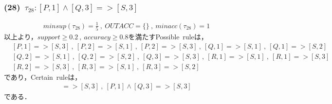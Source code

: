 \documentclass[a4paper,12pt]{jarticle}
\begin{document}
\subsubsection*{(28)~$\tau_{28}:[P,1]\land[Q,3]=>[S,3]$}
\vspace{-4mm}
%
\begin{align*}
 minsup(\tau_{28})=\frac{1}{5}~,~OUTACC=\{\}~,~minacc(\tau_{28})=1
\end{align*}
%
以上より，$support\geq0.2~,~accuracy\geq0.8$を満たすPossible~ruleは，
%
\begin{align*}
 &[P,1]=>[S,3]~,~[P,2]=>[S,1]~,~[P,2]=>[S,3]~,~[Q,1]=>[S,1]~,~[Q,1]=>[S,2] \\
 &[Q,2]=>[S,1]~,~[Q,2]=>[S,2]~,~[Q,3]=>[S,3]~,~[R,1]=>[S,1]~,~[R,1]=>[S,3] \\
 &[R,2]=>[S,3]~,~[R,3]=>[S,1]~,~[R,3]=>[S,2]
\end{align*}
%
であり，Certain~ruleは，
%
\begin{align*}
 [R,2]=>[S,3]~,~[P,1]\land[Q,3]=>[S,3]
\end{align*}
%
である．
\end{document}
